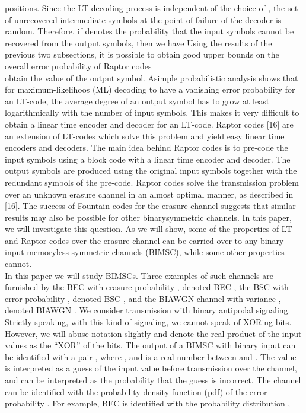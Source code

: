 positions. Since the LT-decoding process is independent of the
choice of , the set of unrecovered intermediate symbols at the
point of failure of the decoder is random. Therefore, if denotes
the probability that the input symbols cannot be recovered
from the output symbols, then we have
Using the results of the previous two subsections, it is possible
to obtain good upper bounds on the overall error probability of
Raptor codes\\
obtain
the value of the output symbol.
Asimple probabilistic analysis shows that for maximum-likelihoos
(ML) decoding to have a vanishing error probability for
an LT-code, the average degree of an output symbol has to grow
at least logarithmically with the number of input symbols. This
makes it very difficult to obtain a linear time encoder and decoder
for an LT-code. Raptor codes [16] are an extension of
LT-codes which solve this problem and yield easy linear time
encoders and decoders. The main idea behind Raptor codes is to
pre-code the input symbols using a block code with a linear time
encoder and decoder. The output symbols are produced using
the original input symbols together with the redundant symbols
of the pre-code. Raptor codes solve the transmission problem
over an unknown erasure channel in an almost optimal manner,
as described in [16].
The success of Fountain codes for the erasure channel suggests
that similar results may also be possible for other binarysymmetric
channels. In this paper, we will investigate this question.
As we will show, some of the properties of LT- and Raptor
codes over the erasure channel can be carried over to any binary
input memoryless symmetric channels (BIMSC), while some
other properties cannot. \\
In this paper we will study BIMSCs. Three examples of such
channels are furnished by the BEC with erasure probability
, denoted BEC , the BSC with error probability , denoted
BSC , and the BIAWGN channel with variance , denoted
BIAWGN .
We consider transmission with binary antipodal signaling.
Strictly speaking, with this kind of signaling, we cannot speak
of XORing bits. However, we will abuse notation slightly and denote
the real product of the input values as the “XOR” of the bits.
The output of a BIMSC with binary input can be
identified with a pair , where , and is a
real number between and . The value is interpreted as
a guess of the input value before transmission over the channel,
and can be interpreted as the probability that the guess is incorrect.
The channel can be identified with the probability density
function (pdf) of the error probability . For example, BEC is
identified with the probability distribution ,\\

